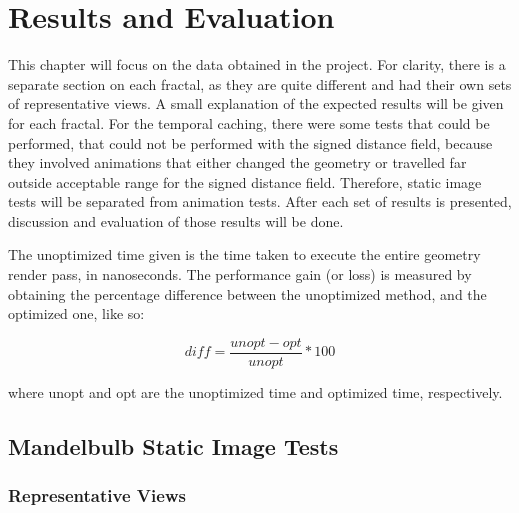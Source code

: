 \chapter{Results and Evaluation}
\label{chapter:results-and-evaluation}

This chapter will focus on the data obtained in the project. For clarity, there is a separate section on each fractal, as they are quite different and had their own sets of representative views. A small explanation of the expected results will be given for each fractal. For the temporal caching, there were some tests that could be performed, that could not be performed with the signed distance field, because they involved animations that either changed the geometry or travelled far outside acceptable range for the signed distance field. Therefore, static image tests will be separated from animation tests. After each set of results is presented, discussion and evaluation of those results will be done.\newline

The unoptimized time given is the time taken to execute the entire geometry render pass, in nanoseconds. The performance gain (or loss) is measured by obtaining the percentage difference between the unoptimized method, and the optimized one, like so:

\begin{equation}
	diff = \frac{unopt - opt}{unopt} * 100
\end{equation}

where unopt and opt are the unoptimized time and optimized time, respectively.

\section{Mandelbulb Static Image Tests}

\subsection{Representative Views}


